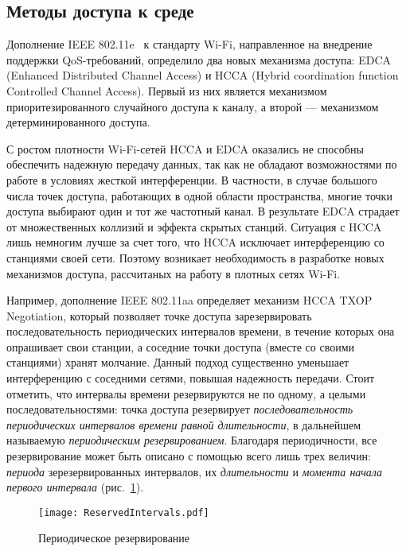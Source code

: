 \subsection{Методы доступа к среде}
\label{sec:methods}

Дополнение IEEE 802.11e~\cite{802.11e} к стандарту Wi-Fi, направленное на внедрение поддержки QoS-требований, определило два новых механизма доступа: EDCA (Enhanced Distributed Channel Access) и HCCA (Hybrid coordination function Controlled Channel Access). Первый из них является механизмом приоритезированного случайного доступа к каналу, а второй --- механизмом детерминированного доступа.

С ростом плотности Wi-Fi-сетей HCCA и EDCA оказались не способны обеспечить надежную передачу данных, так как не обладают возможностями по работе в условиях жесткой интерференции. В частности, в случае большого числа точек доступа, работающих в одной области пространства, многие точки доступа выбирают один и тот же частотный канал. В результате EDCA страдает от множественных коллизий и эффекта скрытых станций. Ситуация с HCCA лишь немногим лучше за счет того, что HCCA исключает интерференцию со станциями своей сети. Поэтому возникает необходимость в разработке новых механизмов доступа, рассчитаных на работу в плотных сетях Wi-Fi.

Например, дополнение IEEE 802.11aa определяет механизм HCCA TXOP Negotiation, который позволяет точке доступа зарезервировать последовательность периодических интервалов времени, в течение которых она опрашивает свои станции, а соседние точки доступа (вместе со своими станциями) хранят молчание.  Данный подход существенно уменьшает интерференцию с соседними сетями, повышая надежность передачи. Стоит отметить, что интервалы времени резервируются не по одному, а целыми последовательностями: точка доступа резервирует \textit{последовательность периодических интервалов времени равной длительности}, в дальнейшем называемую \textit{периодическим резервированием}. Благодаря периодичности, все резервирование может быть описано с помощью всего лишь трех величин: \textit{периода} зерезервированных интервалов, их \textit{длительности} и \textit{момента начала первого интервала} (рис.~\ref{fig:periodic_reservation}).

\begin{figure}[h]
\texttt{[image: ReservedIntervals.pdf]}
\caption{\label{fig:periodic_reservation} Периодическое резервирование}
\end{figure} 

